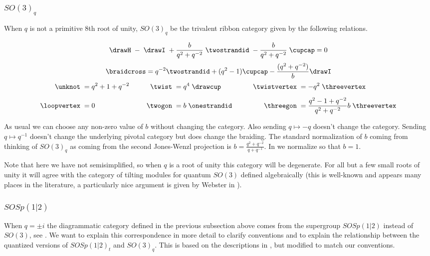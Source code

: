 \documentclass[12pt]{amsart}
\begin{document}
\subsubsection{$SO(3)_q$}
\begin{definition}
When $q$ is not a primitive $8$th root of unity, $SO(3)_q$ be the trivalent ribbon category given by the following relations.

$$  \drawH \; - \; \drawI \; + \frac{b}{q^2+q^{-2}}\; \twostrandid \; -  \frac{b}{q^2+q^{-2}}\; \cupcap = 0$$
$$\braidcross  =  q^{-2} \twostrandid + (q^2 - 1) \cupcap - \frac{(q^2+q^{-2})}{b} \drawI$$
\begin{align*}
    \unknot\; &= q^2+1+q^{-2}&\qquad
      \twist\; &= q^4 \;\drawcup&\qquad
        \twistvertex\; &= -q^2\;\threevertex\\[5pt]
    \loopvertex\;&=0&
      \twogon\;&= b\;\onestrandid&
        \threegon\; &= \frac{q^2-1+q^{-2}}{q^2+q^{-2}} b\;\threevertex
\end{align*}
\end{definition}

As usual we can choose any non-zero value of $b$ without changing the category.  Also sending $q \mapsto -q$ doesn't change the category.  Sending $q \mapsto q^{-1}$ doesn't change the underlying pivotal category but does change the braiding.  The standard normalization of $b$ coming from thinking of $SO(3)_q$ as coming from the second Jones-Wenzl projection is $b = \frac{q^2+q^{-2}}{q+q^{-1}}$. In \cite{MR3624901} we normalize so that $b=1$.

Note that here we have not semisimplified, so when $q$ is a root of unity this category will be degenerate.  For all but a few small roots of unity it will agree with the category of tilting modules for quantum $SO(3)$ defined algebraically (this is well-known and appears many places in the literature, a particularly nice argument is given by Webster in \cite[Lemma A.7]{MR3624396}).


\subsubsection{$SOSp(1|2)$}
When $q=\pm i$ the diagrammatic category defined in the previous subsection above comes from the supergroup $SOSp(1|2)$ instead of $SO(3)$, see \cite{MR3624901}.  We want to explain this correspondence in more detail to clarify conventions and to explain the relationship between the quantized versions of $SOSp(1|2)_t$ and $SO(3)_q$.  This is based on the descriptions in \cite{MR1010993, MR1057559}, but modified to match our conventions.  %
\end{document}

